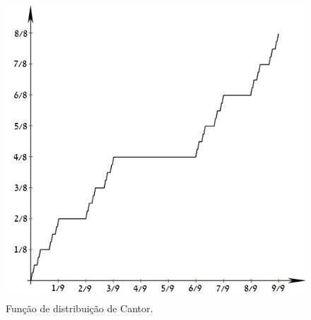 \begin{frame}
\begin{figure}[!htbp]
	\begin{center}
		\includegraphics[scale=0.22]{
			CantorEscalier-2.png}
		\caption{\label{fig15} Função de distribuição de Cantor.}
	\end{center}
	\end{figure}
	
\end{frame}	




